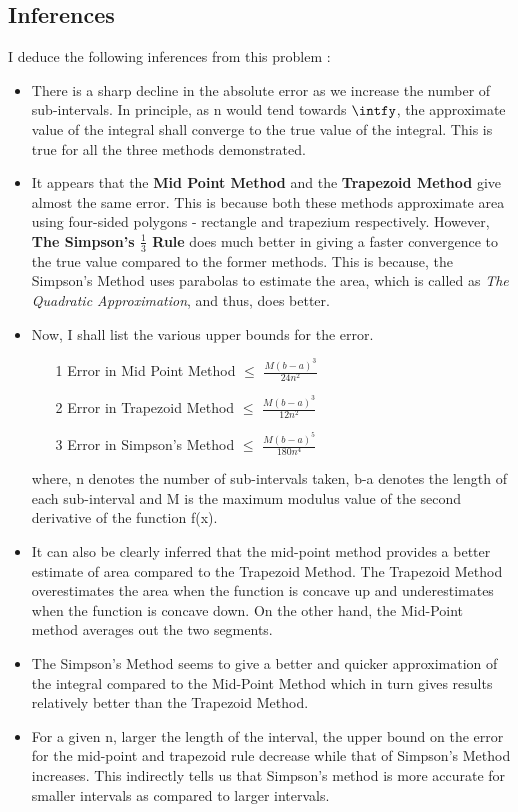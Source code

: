 \documentclass[titlepage, 11pt]{article}
\begin{document}
\subsection{Inferences}
I deduce the following inferences from this problem :
\begin{itemize}
    \item There is a sharp decline in the absolute error as we increase the number of sub-intervals. In principle, as n would tend towards $\intfy$, the approximate value of the integral shall converge to the true value of the integral. This is true for all the three methods demonstrated.  
    \item It appears that the \textbf{Mid Point Method} and the  \textbf{Trapezoid Method} give almost the same error. This is because both these methods approximate area using four-sided polygons - rectangle and trapezium respectively. However, \textbf{The Simpson's $\frac{1}{3}$ Rule} does much better in giving a faster convergence to the true value compared to the former methods. This is because, the Simpson's Method uses parabolas to estimate the area, which is called as \textit{The Quadratic Approximation}, and thus, does better. 
    \item Now, I shall list the various upper bounds for the error.
    \begin{itemize}
        \item [1] Error in Mid Point Method $\leq$ $\frac{M(b-a)^3}{24n^2}$
        \item [2] Error in Trapezoid Method $\leq$ $\frac{M(b-a)^3}{12n^2}$
        \item [3] Error in Simpson's Method $\leq$ $\frac{M(b-a)^5}{180n^4}$
    \end{itemize}
    where, n denotes the number of sub-intervals taken, b-a denotes the length of each sub-interval and M is the maximum modulus value of the second derivative of the function f(x).
    \item It can also be clearly inferred that the mid-point method provides a better estimate of area compared to the Trapezoid Method. The Trapezoid Method overestimates the area when the function is concave up and underestimates when the function is concave down. On the other hand, the Mid-Point method averages out the two segments. 
     \item The Simpson's Method seems to give a better and quicker approximation of the integral compared to the Mid-Point Method which in turn gives results relatively better than the Trapezoid Method.
    \item For a given n, larger the length of the interval, the upper bound on the error for the mid-point and trapezoid rule decrease while that of Simpson's Method increases. This indirectly tells us that Simpson's method is more accurate for smaller intervals as compared to larger intervals. 

\end{itemize}
\end{document}
